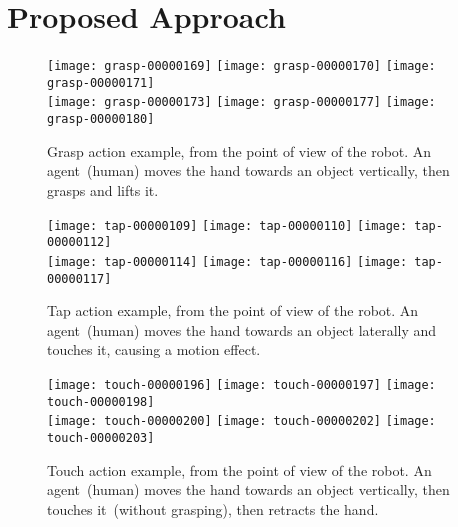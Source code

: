
\section{Proposed Approach}

\newcommand{\myWidth}{0.22}
\begin{figure*}
    \centering
    \subfloat
    { \texttt{[image: grasp-00000169]} } \quad
    \subfloat
    { \texttt{[image: grasp-00000170]} } \quad
    \subfloat
    { \texttt{[image: grasp-00000171]} } \\
    \subfloat
    { \texttt{[image: grasp-00000173]} } \quad
    \subfloat
    { \texttt{[image: grasp-00000177]} } \quad
    \subfloat
    { \texttt{[image: grasp-00000180]} }
    \caption{Grasp action example, from the point of view of the robot. An agent~(human) moves the hand towards an object vertically, then grasps and lifts it.}
    \label{fig:action_examples:grasp}
\end{figure*}

\begin{figure*}
    \centering
    \subfloat
    { \texttt{[image: tap-00000109]} } \quad
    \subfloat
    { \texttt{[image: tap-00000110]} } \quad
    \subfloat
    { \texttt{[image: tap-00000112]} } \\
    \subfloat
    { \texttt{[image: tap-00000114]} } \quad
    \subfloat
    { \texttt{[image: tap-00000116]} } \quad
    \subfloat
    { \texttt{[image: tap-00000117]} }
    \caption{Tap action example, from the point of view of the robot. An agent~(human) moves the hand towards an object laterally and touches it, causing a motion effect.}
    \label{fig:action_examples:tap}
\end{figure*}

\begin{figure*}
    \centering
    \subfloat
    { \texttt{[image: touch-00000196]} } \quad
    \subfloat
    { \texttt{[image: touch-00000197]} } \quad
    \subfloat
    { \texttt{[image: touch-00000198]} } \\
    \subfloat
    { \texttt{[image: touch-00000200]} } \quad
    \subfloat
    { \texttt{[image: touch-00000202]} } \quad
    \subfloat
    { \texttt{[image: touch-00000203]} }
    \caption{Touch action example, from the point of view of the robot. An agent~(human) moves the hand towards an object vertically, then touches it~(without grasping), then retracts the hand.}
    \label{fig:action_examples:touch}
\end{figure*}

